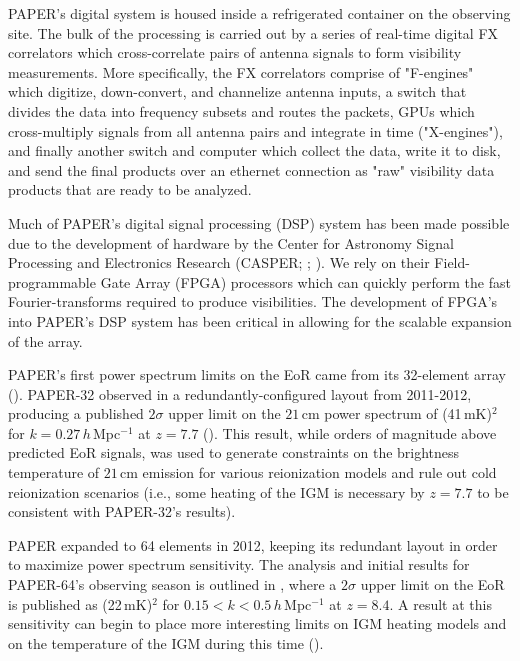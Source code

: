 PAPER's digital system is housed inside a refrigerated container on the observing site. The bulk of the processing is carried out by a series of real-time digital FX correlators which cross-correlate pairs of antenna signals to form visibility measurements. More specifically, the FX correlators comprise of "F-engines" which digitize, down-convert, and channelize antenna inputs, a switch that divides the data into frequency subsets and routes the packets, GPUs which cross-multiply signals from all antenna pairs and integrate in time ("X-engines"), and finally another switch and computer which collect the data, write it to disk, and send the final products over an ethernet connection as "raw" visibility data products that are ready to be analyzed. 

Much of PAPER's digital signal processing (DSP) system has been made possible due to the development of hardware by the Center for Astronomy Signal Processing and Electronics Research (CASPER; \citealt{parsons_et_al2006}; \citealt{hickish_et_al2016}). We rely on their Field-programmable Gate Array (FPGA) processors which can quickly perform the fast Fourier-transforms required to produce visibilities. The development of FPGA's into PAPER's DSP system has been critical in allowing for the scalable expansion of the array. 

PAPER's first power spectrum limits on the EoR came from its 32-element array (\citealt{parsons_et_al2014}). PAPER-32 observed in a redundantly-configured layout from 2011-2012, producing a published $2\sigma$ upper limit on the $21$\,cm power spectrum of (41\,mK)$^{2}$ for $k=0.27\, h$\,Mpc$^{-1}$ at $z=7.7$ (\citealt{parsons_et_al2014}). This result, while orders of magnitude above predicted EoR signals, was used to generate constraints on the brightness temperature of $21$\,cm emission for various reionization models and rule out cold reionization scenarios (i.e., some heating of the IGM is necessary by $z=7.7$ to be consistent with PAPER-32's results).

PAPER expanded to 64 elements in 2012, keeping its redundant layout in order to maximize power spectrum sensitivity. The analysis and initial results for PAPER-64's observing season is outlined in \citealt{ali_et_al2015}, where a $2\sigma$ upper limit on the EoR is published as (22\,mK)$^{2}$ for $0.15 < k < 0.5\,h$\,Mpc$^{-1}$ at $z=8.4$. A result at this sensitivity can begin to place more interesting limits on IGM heating models and on the temperature of the IGM during this time (\citealt{pober_et_al2015}).

